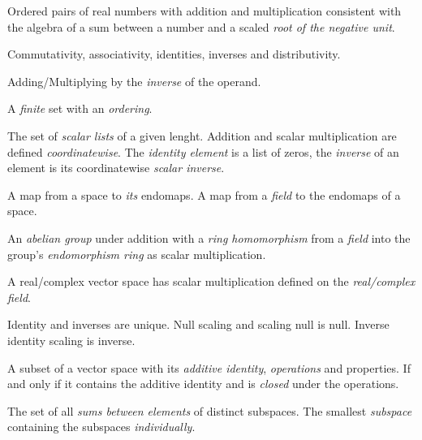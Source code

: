 \pagebreak


\begin{multicols}{3}

  Ordered pairs of real numbers with addition and multiplication consistent with
  the algebra of a sum between a number and a scaled \textit{root of the negative unit}.

  Commutativity, associativity, identities, inverses and distributivity.

  Adding/Multiplying by the \textit{inverse} of the operand.

  A \textit{finite} set with an \textit{ordering}.

  The set of \textit{scalar lists} of a given lenght.
  Addition and scalar multiplication are defined \textit{coordinatewise}.
  The \textit{identity element} is a list of zeros, the \textit{inverse}
  of an element is its coordinatewise \textit{scalar inverse}.

  A map from a space to \textit{its} endomaps.
  A map from a \textit{field} to the endomaps of a space.

  An \textit{abelian group} under addition with a \textit{ring homomorphism} from a \textit{field} into the group's \textit{endomorphism ring} as scalar multiplication.

  A real/complex vector space has scalar multiplication defined on the \textit{real/complex field}.

  Identity and inverses are unique. Null scaling and scaling null is null. Inverse identity scaling is inverse.

  A subset of a vector space with its \textit{additive identity}, \textit{operations} and properties.
  If and only if it contains the additive identity and is \textit{closed} under the operations.

  The set of all \textit{sums between elements} of distinct subspaces.
  The smallest \textit{subspace} containing the subspaces \textit{individually}.


\end{multicols}
